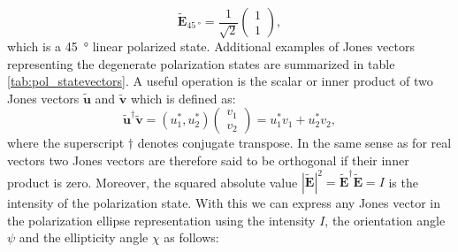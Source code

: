 \begin{equation}
    \bm{\tilde{E}}_{\SI{45}{\degree}}= \frac{1}{\sqrt{2}}
    \begin{pmatrix}
    1 \\
    1
    \end{pmatrix},
\end{equation}
which is a \SI{45}{\degree} linear polarized state. Additional examples of Jones vectors representing the degenerate polarization states are summarized in table \ref{tab:pol_statevectors}. A useful operation is the scalar or inner product of two Jones vectors $\bm{\tilde{u}}$ and $\bm{\tilde{v}}$ which is defined as:
\begin{equation}
    \bm{\tilde{u}}^{\dagger}\bm{\tilde{v}} = \left(u_1^{*}, u_2^{*} \right)
    \begin{pmatrix}
    v_1 \\
    v_2
    \end{pmatrix}
    = u_1^{*}v_1 + u_2^{*}v_2,
\end{equation}
where the superscript $\dagger$ denotes conjugate transpose. In the same sense as for real vectors two Jones vectors are therefore said to be orthogonal if their inner product is zero. Moreover, the squared absolute value $|\bm{\tilde{E}}|^2=\bm{\tilde{E}}^{\dagger}\bm{\tilde{E}}=I$ is the intensity of the polarization state. With this we can express any Jones vector in the polarization ellipse representation using the intensity $I$, the orientation angle $\psi$ and the ellipticity angle $\chi$ as follows:

